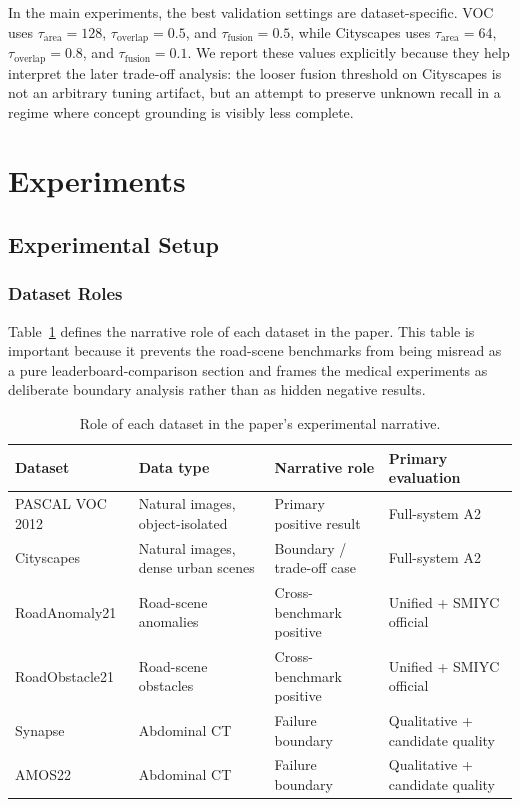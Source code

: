 \documentclass[a4paper,fleqn]{cas-dc}
\begin{document}
In the main experiments, the best validation settings are dataset-specific. VOC uses $\tau_{\text{area}} = 128$, $\tau_{\text{overlap}} = 0.5$, and $\tau_{\text{fusion}} = 0.5$, while Cityscapes uses $\tau_{\text{area}} = 64$, $\tau_{\text{overlap}} = 0.8$, and $\tau_{\text{fusion}} = 0.1$. We report these values explicitly because they help interpret the later trade-off analysis: the looser fusion threshold on Cityscapes is not an arbitrary tuning artifact, but an attempt to preserve unknown recall in a regime where concept grounding is visibly less complete.

\section{Experiments}
\label{sec:exp}

\subsection{Experimental Setup}
\label{sec:exp:setup}

\subsubsection{Dataset Roles}
\label{sec:exp:roles}

Table~\ref{tab:dataset-roles} defines the narrative role of each dataset in the paper. This table is important because it prevents the road-scene benchmarks from being misread as a pure leaderboard-comparison section and frames the medical experiments as deliberate boundary analysis rather than as hidden negative results.

\begin{table}[!t]
  \caption{Role of each dataset in the paper's experimental narrative.}
  \label{tab:dataset-roles}
  \centering
  \begin{tabular}{llll}
    \toprule
    Dataset & Data type & Narrative role & Primary evaluation \\
    \midrule
    PASCAL VOC 2012 & Natural images, object-isolated & Primary positive result & Full-system A2 \\
    Cityscapes & Natural images, dense urban scenes & Boundary / trade-off case & Full-system A2 \\
    RoadAnomaly21 & Road-scene anomalies & Cross-benchmark positive & Unified + SMIYC official \\
    RoadObstacle21 & Road-scene obstacles & Cross-benchmark positive & Unified + SMIYC official \\
    Synapse & Abdominal CT & Failure boundary & Qualitative + candidate quality \\
    AMOS22 & Abdominal CT & Failure boundary & Qualitative + candidate quality \\
    \bottomrule
  \end{tabular}
\end{table}
\end{document}
